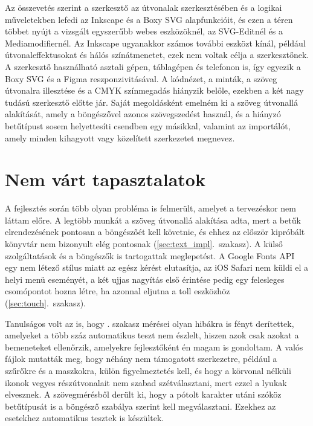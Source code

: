 Az összevetés szerint a szerkesztő az útvonalak szerkesztésében és a logikai műveletekben lefedi az Inkscape és a Boxy SVG alapfunkcióit, és ezen a téren többet nyújt a vizsgált egyszerűbb webes eszközöknél, az SVG-Editnél és a Mediamodifiernél. Az Inkscape ugyanakkor számos további eszközt kínál, például útvonaleffektusokat és hálós színátmenetet, ezek nem voltak célja a szerkesztőnek. A szerkesztő használható asztali gépen, táblagépen és telefonon is, így egyezik a Boxy SVG és a Figma reszponzivitásával. A kódnézet, a minták, a szöveg útvonalra illesztése és a CMYK színmegadás hiányzik belőle, ezekben a két nagy tudású szerkesztő előtte jár. Saját megoldásként emelném ki a szöveg útvonallá alakítását, amely a böngészővel azonos szövegszedést használ, és a hiányzó betűtípust sosem helyettesíti csendben egy másikkal, valamint az importálót, amely minden kihagyott vagy közelített szerkezetet megnevez.

\newpage
\section{Nem várt tapasztalatok}
\label{sec:unexpected}

A fejlesztés során több olyan probléma is felmerült, amelyet a tervezéskor nem láttam előre. A legtöbb munkát a szöveg útvonallá alakítása adta, mert a betűk elrendezésének pontosan a böngészőét kell követnie, és ehhez az először kipróbált könyvtár nem bizonyult elég pontosnak (\ref{sec:text_impl}.~szakasz). A külső szolgáltatások és a böngészők is tartogattak meglepetést. A Google Fonts API egy nem létező stílus miatt az egész kérést elutasítja, az iOS Safari nem küldi el a helyi menü eseményét, a két ujjas nagyítás első érintése pedig egy felesleges csomópontot hozna létre, ha azonnal eljutna a toll eszközhöz (\ref{sec:touch}.~szakasz).

Tanulságos volt az is, hogy . szakasz mérései olyan hibákra is fényt derítettek, amelyeket a több száz automatikus teszt nem észlelt, hiszen azok csak azokat a bemeneteket ellenőrzik, amelyekre fejlesztőként én magam is gondoltam. A valós fájlok mutatták meg, hogy néhány nem támogatott szerkezetre, például a szűrőkre és a maszkokra, külön figyelmeztetés kell, és hogy a körvonal nélküli ikonok vegyes részútvonalait nem szabad szétválasztani, mert ezzel a lyukak elvesznek. A szövegmérésből derült ki, hogy a pótolt karakter utáni szóköz betűtípusát is a böngésző szabálya szerint kell megválasztani. Ezekhez az esetekhez automatikus tesztek is készültek.

